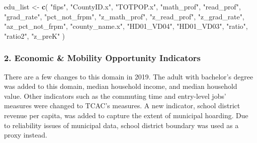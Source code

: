 \documentclass[]{article}
\newenvironment{Shaded}{\begin{snugshade}}{\end{snugshade}}
\newcommand{\KeywordTok}[1]{\textcolor[rgb]{0.13,0.29,0.53}{\textbf{#1}}}
\newcommand{\StringTok}[1]{\textcolor[rgb]{0.31,0.60,0.02}{#1}}
\newcommand{\NormalTok}[1]{#1}
\begin{document}
\begin{Shaded}
\begin{Highlighting}[]
\NormalTok{edu_list <-}
\StringTok{  }\KeywordTok{c}\NormalTok{(}
  \StringTok{"fips"}\NormalTok{,}
  \StringTok{"CountyID.x"}\NormalTok{,}
  \StringTok{"TOTPOP.x"}\NormalTok{,}
  \StringTok{"math_prof"}\NormalTok{,}
  \StringTok{"read_prof"}\NormalTok{,}
  \StringTok{"grad_rate"}\NormalTok{,}
  \StringTok{"pct_not_frpm"}\NormalTok{,}
  \StringTok{"z_math_prof"}\NormalTok{,}
  \StringTok{"z_read_prof"}\NormalTok{,}
  \StringTok{"z_grad_rate"}\NormalTok{,}
  \StringTok{"az_pct_not_frpm"}\NormalTok{,}
  \StringTok{"county_name.x"}\NormalTok{,}
  \StringTok{"HD01_VD04"}\NormalTok{,}
  \StringTok{"HD01_VD03"}\NormalTok{,}
  \StringTok{"ratio"}\NormalTok{,}
  \StringTok{"ratio2"}\NormalTok{,}
  \StringTok{"z_preK"}
\NormalTok{  )}
\end{Highlighting}
\end{Shaded}

\subsubsection{2. Economic \& Mobility Opportunity
Indicators}\label{economic-mobility-opportunity-indicators}

There are a few changes to this domain in 2019. The adult with
bachelor's degree was added to this domain, median household income, and
median household value. Other indicators such as the commuting time and
entry-level jobs' measures were changed to TCAC's measures. A new
indicator, school district revenue per capita, was added to capture the
extent of municipal hoarding. Due to reliability issues of municipal
data, school district boundary was used as a proxy instead.
\end{document}
